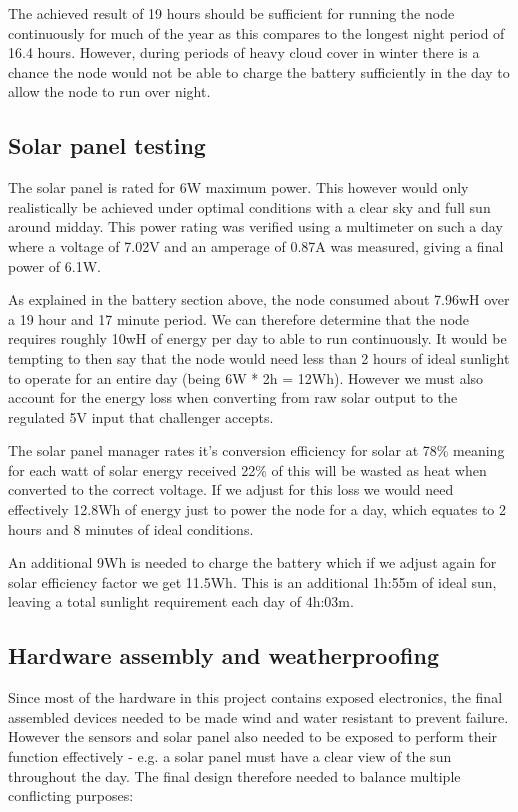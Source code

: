 The achieved result of 19 hours should be sufficient for running the node
continuously for much of the year as this compares to the longest night period
of 16.4 hours. However, during periods of heavy cloud cover in winter there is a
chance the node would not be able to charge the battery sufficiently in the day
to allow the node to run over night.

\subsection{Solar panel testing}\label{sec:solar-tests}

The solar panel is rated for 6W maximum power. This however would only
realistically be achieved under optimal conditions with a clear sky and full sun
around midday. This power rating was verified using a multimeter on such a day
where a voltage of 7.02V and an amperage of 0.87A was measured, giving a final
power of 6.1W.

As explained in the battery section above, the node consumed about 7.96wH over a
19 hour and 17 minute period. We can therefore determine that the node requires
roughly 10wH of energy per day to able to run continuously. It would be tempting
to then say that the node would need less than 2 hours of ideal sunlight to
operate for an entire day (being 6W * 2h = 12Wh). However we must also account
for the energy loss when converting from raw solar output to the regulated 5V
input that challenger accepts.

The solar panel manager rates it's conversion efficiency for solar at 78\%
meaning for each watt of solar energy received 22\% of this will be wasted as
heat when converted to the correct voltage. If we adjust for this loss we would
need effectively 12.8Wh of energy just to power the node for a day, which
equates to 2 hours and 8 minutes of ideal conditions.

An additional 9Wh is needed to charge the battery which if we adjust again for
solar efficiency factor we get 11.5Wh. This is an additional 1h:55m of ideal
sun, leaving a total sunlight requirement each day of 4h:03m.

\subsection{Hardware assembly and weatherproofing}

Since most of the hardware in this project contains exposed electronics, the
final assembled devices needed to be made wind and water resistant to prevent
failure. However the sensors and solar panel also needed to be exposed to
perform their function effectively - e.g. a solar panel must have a clear view
of the sun throughout the day. The final design therefore needed to balance
multiple conflicting purposes:


